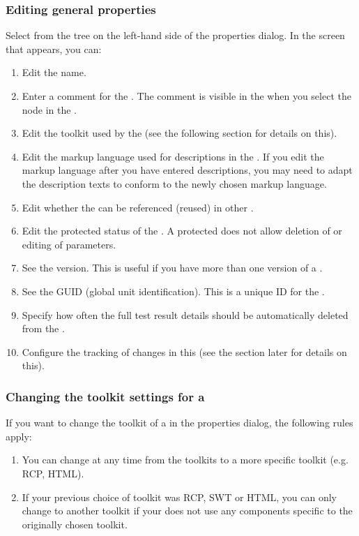 \subsubsection{Editing general \gdproject{} properties}
\label{ProjPropertiesGeneral}
Select  from the tree on the left-hand side of the \gdproject{} properties dialog. In the screen that appears, you can:
\begin{enumerate}
\item Edit the \gdproject{} name. 
\item Enter a comment for the \gdproject{}. The comment is visible in the \gdpropview{} when you select the \gdproject{} node in the \gdtestsuitebrowser{}.
\item Edit the toolkit used by the \gdproject{} (see the following section  for details on this). 
\item Edit the markup language used for descriptions in the \gdproject{} . If you edit the markup language after you have entered descriptions, you may need to adapt the description texts to conform to the newly chosen markup language.
\item Edit whether the \gdproject{} can be referenced (reused) in other \gdprojects{}.
\item Edit the protected status of the \gdproject{}. A protected \gdproject{} does not allow deletion of \gdcases{} or editing of parameters. 
\item See the \gdproject{} version. This is useful if you have more than one version of a \gdproject{}. 
\item See the GUID (global unit identification). This is a unique ID for the \gdproject{}. 
\item Specify how often the full test result details  should be automatically deleted from the \gddb{}.
\item Configure the tracking of changes in this \gdproject{} (see the section later  for details on this).
\end{enumerate}

\subsubsection{Changing the toolkit settings for a \gdproject{}}
\label{ProjPropertiesChangingToolkit}
If you want to change the toolkit of a \gdproject{} in the \gdproject{} properties dialog, the following rules apply:
\begin{enumerate}
\item You can change at any time from the  toolkits to a more specific toolkit (e.g. RCP, HTML). 
\item If your previous choice of toolkit was RCP, SWT or HTML, you can only change to another toolkit if your \gdproject{} does not use any components specific to the originally chosen toolkit. 
\end{enumerate}

